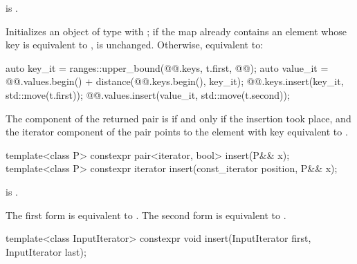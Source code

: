 \begin{itemdescr}
\pnum
\constraints
{} is .

\pnum
\effects
Initializes an object  of type 
with ;
if the map already contains an element
whose key is equivalent to ,
 is unchanged.
Otherwise, equivalent to:
\begin{codeblock}
auto key_it = ranges::upper_bound(@@.keys, t.first, @@);
auto value_it = @@.values.begin() + distance(@@.keys.begin(), key_it);
@@.keys.insert(key_it, std::move(t.first));
@@.values.insert(value_it, std::move(t.second));
\end{codeblock}

\pnum
\returns
The  component of the returned pair is 
if and only if the insertion took place, and
the iterator component of the pair points to
the element with key equivalent to .
\end{itemdescr}

%
\begin{itemdecl}
template<class P> constexpr pair<iterator, bool> insert(P&& x);
template<class P> constexpr iterator insert(const_iterator position, P&& x);
\end{itemdecl}

\begin{itemdescr}
\pnum
\constraints
{} is .

\pnum
\effects
The first form is equivalent to .
The second form is equivalent to
.
\end{itemdescr}

%
\begin{itemdecl}
template<class InputIterator>
  constexpr void insert(InputIterator first, InputIterator last);
\end{itemdecl}

